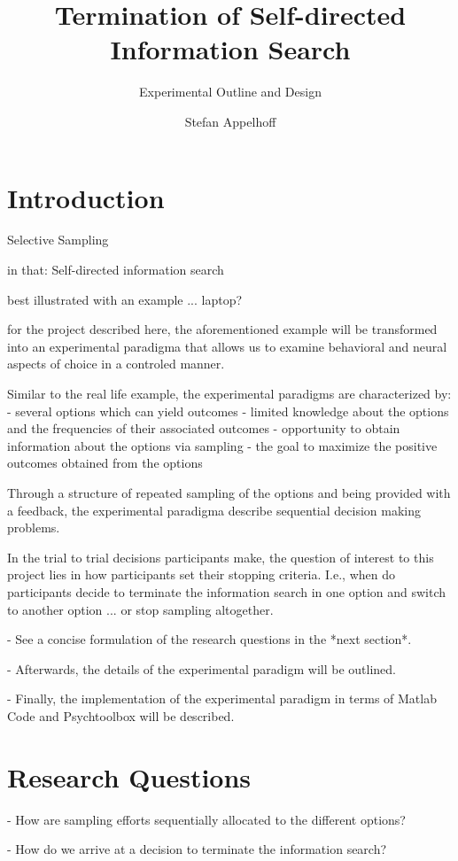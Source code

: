 \documentclass[12pt, oneside]{scrartcl}
\title{Termination of Self-directed Information Search}
\subtitle{Experimental Outline and Design}
\author{Stefan Appelhoff}
\begin{document}
\maketitle
\section{Introduction}


Selective Sampling

in that: Self-directed information search

best illustrated with an example ... laptop?

for the project described here, the aforementioned example will be transformed into an experimental paradigma that allows us to examine behavioral and neural aspects of choice in a controled manner.

Similar to the real life example, the experimental paradigms are characterized by:
- several options which can yield outcomes
- limited knowledge about the options and the frequencies of their associated outcomes
- opportunity to obtain information about the options via sampling
- the goal to maximize the positive outcomes obtained from the options

Through a structure of repeated sampling of the options and being provided with a feedback, the experimental paradigma describe sequential decision making problems.

In the trial to trial decisions participants make, the question of interest to this project lies in how participants set their stopping criteria. I.e., when do participants decide to terminate the information search in one option and switch to another option ... or stop sampling altogether. 

- See a concise formulation of the research questions in the *next section*.

- Afterwards, the details of the experimental paradigm will be outlined.

- Finally, the implementation of the experimental paradigm in terms of Matlab Code and Psychtoolbox will be described.



\section{Research Questions}

- How are sampling efforts sequentially allocated to the different options?

- How do we arrive at a decision to terminate the information search?
\end{document}
